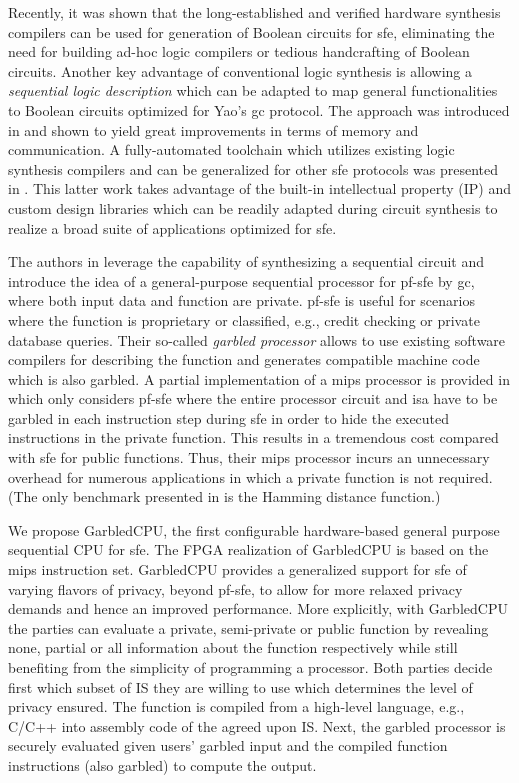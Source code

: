 Recently, it was shown that the long-established and verified hardware synthesis compilers can be used for generation of Boolean circuits for \acrshort{sfe}, eliminating the need for building ad-hoc logic compilers or tedious handcrafting of Boolean circuits. Another key advantage of conventional logic synthesis is allowing a \emph{sequential logic description} which can be adapted to map general functionalities to Boolean circuits optimized for Yao's \acrshort{gc} protocol. The approach was introduced in \cite{songhori2015tinygarble} and shown to yield great improvements in terms of memory and communication. A fully-automated toolchain which utilizes existing logic synthesis compilers and can be generalized for other \acrshort{sfe} protocols was presented in \cite{demmler2015automated}. This latter work takes advantage of the built-in intellectual property (IP) and custom design libraries which can be readily adapted during circuit synthesis to realize a broad suite of applications optimized for \acrshort{sfe}.

The authors in \cite{songhori2015tinygarble} leverage the capability of synthesizing a sequential circuit and introduce the idea of a general-purpose sequential processor for \acrfull{pf-sfe} by \acrshort{gc}, where both input data and function are private. \acrshort{pf-sfe} is useful for scenarios where the function is proprietary or classified, e.g., credit checking or private database queries. Their so-called \emph{garbled processor} allows to use existing software compilers for describing the function and generates compatible machine code which is also garbled. A partial implementation of a \acrshort{mips} processor is provided in \cite{songhori2015tinygarble} which only considers \acrshort{pf-sfe} where the entire processor circuit and \acrfull{isa} have to be garbled in each instruction step during \acrshort{sfe} in order to hide the executed instructions in the private function. This results in a tremendous cost compared with \acrshort{sfe} for public functions. Thus, their \acrshort{mips} processor incurs an unnecessary overhead for numerous applications in which a private function is not required. (The only benchmark presented in \cite{songhori2015tinygarble} is the Hamming distance function.)

We propose GarbledCPU, the first configurable hardware-based general purpose sequential CPU for \acrshort{sfe}. The FPGA realization of GarbledCPU is based on the \acrshort{mips} instruction set. GarbledCPU provides a generalized support for \acrshort{sfe} of varying flavors of privacy, beyond \acrshort{pf-sfe}, to allow for more relaxed privacy demands and hence an improved performance. More explicitly, with GarbledCPU the parties can evaluate a private, semi-private or public function by revealing none, partial or all information about the function respectively while still benefiting from the simplicity of programming a processor.
Both parties decide first which subset of IS they are willing to use which determines the level of privacy ensured. The function is compiled from a high-level language, e.g., C/C++ into assembly code of the agreed upon IS. Next, the garbled processor is securely evaluated given users' garbled input and the compiled function instructions (also garbled) to compute the output.

